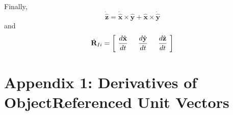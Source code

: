 {\begin{equation}
\end{equation}
%
Finally,
\begin{equation}
    \dot{\hat{\mathbf{z}}} = \dot{\hat{\mathbf{x}}} \times
    \hat{\mathbf{y}}+ \hat{\mathbf{x}} \times
    \dot{\hat{\mathbf{y}}}
\end{equation}
%
and
%
\begin{equation}
     \dot{\mathbf{R}}_{Ii} = \left[\hspace{.05 in} \frac{d\hat{\mathbf{x}}}{dt} \hspace{.2 in}
     \frac{d\hat{\mathbf{y}}}{dt} \hspace{.2 in} \frac{d\hat{\mathbf{z}}}{dt} \hspace{.05 in} \right]
\end{equation}


\section{Appendix 1: Derivatives of ObjectReferenced Unit Vectors}

}
